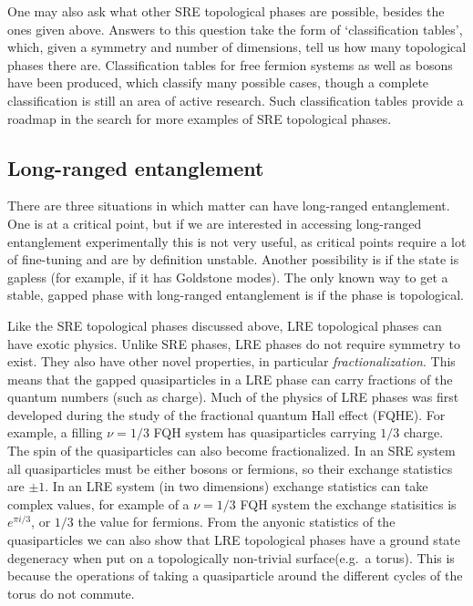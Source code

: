 One may also ask what other SRE topological phases are possible, besides the ones given above. Answers to this question take the form of `classification tables', which, given a symmetry and number of dimensions, tell us how many topological phases there are. Classification tables for free fermion systems\cite{KitaevClass,Ludwig} as well as bosons\cite{WenScience,WenPRB,KapustinThorngren} have been produced, which classify many possible cases, though a complete classification is still an area of active research. Such classification tables provide a roadmap in the search for more examples of SRE topological phases.

\subsection{Long-ranged entanglement}
\label{subsec::LRE}

There are three situations in which matter can have long-ranged entanglement. One is at a critical point, but if we are interested in accessing long-ranged entanglement experimentally this is not very useful, as critical points require a lot of fine-tuning and are by definition unstable. Another possibility is if the state is gapless (for example, if it has Goldstone modes). The only known way to get a stable, gapped phase with long-ranged entanglement is if the phase is topological. 

Like the SRE topological phases discussed above, LRE topological phases can have exotic physics. Unlike SRE phases, LRE phases do not require symmetry to exist. They also have other novel properties, in particular \emph{fractionalization}. This means that the gapped quasiparticles in a LRE phase can carry fractions of the quantum numbers (such as charge). Much of the physics of LRE phases was first developed during the study of the fractional quantum Hall effect (FQHE).\cite{Wen_book} For example, a filling $\nu=1/3$ FQH system has quasiparticles carrying $1/3$ charge\cite{Laughlin-PhysRevLett.50.1395}. The spin of the quasiparticles can also become fractionalized. In an SRE system all quasiparticles must be either bosons or fermions, so their exchange statistics are $\pm 1$. 
In an LRE system (in two dimensions) exchange statistics can take complex values, for example of a $\nu=1/3$ FQH system the exchange statisitics is $e^{\pi i/3}$, or $1/3$ the value for fermions.
From the anyonic statistics of the quasiparticles we can also show that LRE topological phases have a ground state degeneracy when put on a topologically non-trivial surface(e.g.~a torus). This is because the operations of taking a quasiparticle around the different cycles of the torus do not commute.


